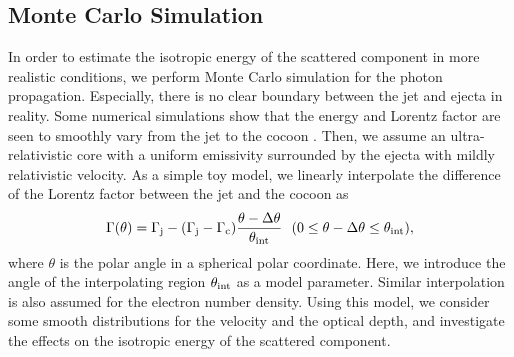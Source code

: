 \documentclass{emulateapj}
\begin{document}
\subsection{Monte Carlo Simulation}
\label{sec:MC}

In order to estimate the isotropic energy of the scattered component in more realistic conditions, 
we perform Monte Carlo simulation for the photon propagation. 
Especially, there is no clear boundary between the jet and ejecta in reality. 
Some numerical simulations show that the energy and Lorentz factor are seen 
to smoothly vary from the jet to the cocoon 
\citep[e.g., ][]{2003ApJ...586..356Z, 2005A&A...436..273A, 2014ApJ...784L..28N, 2014ApJ...788L...8M, 
2017arXiv171203237L, 2017ApJ...835L..34M}. 
Then, we assume an ultra-relativistic core with a uniform emissivity surrounded by the ejecta with mildly relativistic velocity. 
As a simple toy model, we linearly interpolate the difference of the Lorentz factor between 
the jet and the cocoon as
\begin{eqnarray}\label{eq:Gamma(theta)}
\Gamma(\theta) = \Gamma_{\rm j}-(\Gamma_{\rm j}-\Gamma_{\rm c})\frac{\theta-\Delta\theta}{\theta_{\rm int}}
~~(0\le\theta-\Delta\theta\le\theta_{\rm int}),
\end{eqnarray}
where $\theta$ is the polar angle in a spherical polar coordinate. 
Here, we introduce the angle of the interpolating region $\theta_{\rm int}$ as a model parameter. 
Similar interpolation is also assumed for the electron number density. 
Using this model, we consider some smooth distributions for the velocity and the optical depth, 
and investigate the effects on the isotropic energy of the scattered component. 
\end{document}
